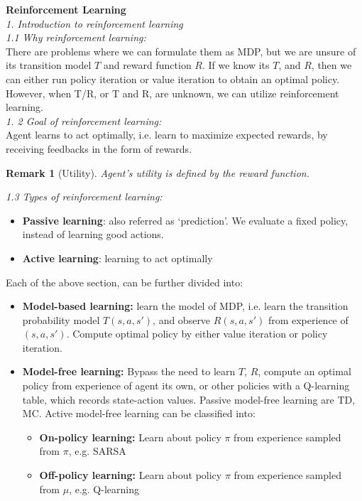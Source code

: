 \documentclass[12pt]{article}
\newtheorem*{remark}{Remark}
\begin{document}
\noindent
{\large{ \textbf{Reinforcement Learning} }}\\

\noindent
\textsl{1. Introduction to reinforcement learning}\\

\noindent
\textsl{1.1 Why reinforcement learning:}\\
There are problems where we can formulate them as MDP, but we are unsure of its transition model $T$ and reward function $R$. If we know its $T$, and $R$, then we can either run policy iteration or value iteration to obtain an optimal policy. However, when T/R, or T and R, are unknown, we can utilize reinforcement learning.  \\

\noindent
\textsl{1. 2 Goal of reinforcement learning:}\\
Agent learns to act optimally, i.e. learn to maximize expected rewards, by receiving feedbacks in the form of rewards. 
\begin{remark}[Utility]
 Agent's utility is defined by the reward function. \\
\end{remark}
\noindent
\textsl{1.3 Types of reinforcement learning:}
\begin{itemize}
\item \textbf{Passive learning}: also referred as `prediction'. We evaluate a fixed policy, instead of learning good actions. 
\item \textbf{Active learning}: learning to act optimally
\end{itemize}
\noindent
Each of the above section, can be further divided into: 
\begin{itemize}
\item \textbf{Model-based learning:} learn the model of MDP, i.e. learn the transition probability model $T(s, a, s')$, and observe $R(s, a, s')$ from experience of $(s, a, s')$. Compute optimal policy by either value iteration or policy iteration.
\item \textbf{Model-free learning:} Bypass the need to learn $T$, $R$, compute an optimal policy from experience of agent its own, or other policies with a Q-learning table, which records state-action values. Passive model-free learning are TD, MC.  Active model-free learning can be classified into:
\begin{itemize}
\item \textbf{On-policy learning:} Learn about policy $\pi$ from experience sampled from $\pi$, e.g. SARSA
\item \textbf{Off-policy learning:} Learn about policy $\pi$ from experience sampled from $\mu$, e.g. Q-learning
\end{itemize}
\end{itemize}
\end{document}
